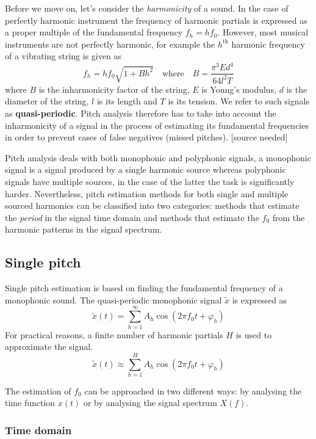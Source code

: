 \documentclass[american,]{article}
\begin{document}
Before we move on, let's consider the \emph{harmonicity} of a sound.
In the case of perfectly harmonic instrument the frequency
of harmonic partials is expressed as a proper multiple
of the fundamental frequency \(f_h = h f_0\).
However, most musical instruments are not perfectly harmonic,
for example the \(h^\text{th}\) harmonic frequency
of a vibrating string is given as
\[ f_h = h f_0 \sqrt{1 + Bh^2} \quad\text{where}\quad
    B = \frac{\pi^3 Ed^4}{64l^2T}\]
where \(B\) is the inharmonicity factor of the string,
\(E\) is Young's modulus, \(d\) is the diameter of the string,
\(l\) is its length and \(T\) is its tension.
We refer to such signals as \textbf{quasi-periodic}.
Pitch analysis therefore has to take into account
the inharmonicity of a signal in the process of estimating
its fundamental frequencies in order to prevent
cases of false negatives (missed pitches).
{[}source needed{]}

Pitch analysis deals with both monophonic and polyphonic signals,
a monophonic signal is a signal produced by a single harmonic
source whereas polyphonic signals have multiple sources,
in the case of the latter the
task is significantly harder.
Nevertheless, pitch estimation methods for both
single and multiple sourced harmonics can be
classified into two categories: methods that
estimate the \emph{period} in the signal time domain
and methods that estimate the \(f_0\) from the harmonic
patterns in the signal spectrum.

\hypertarget{single-pitch}{%
\subsection{Single pitch}\label{single-pitch}}

Single pitch estimation is based on finding the fundamental
frequency of a monophonic sound.
The quasi-periodic monophonic signal \(\tilde{x}\) is expressed as
\[\tilde{x}(t)=\sum_{h=1}^{\infty} A_h\cos(2\pi f_0 t + \varphi_h)\]
For practical reasons, a finite number of harmonic
partials \(H\) is used to approximate the signal.
\[\tilde{x}(t)\approx\sum_{h=1}^{H} A_h\cos(2\pi f_0 t + \varphi_h)\]

The estimation of \(f_0\) can be approached in two
different ways: by analysing the time function \(x(t)\)
or by analysing the signal spectrum \(X(f)\).

\hypertarget{time-domain}{%
\subsubsection{Time domain}\label{time-domain}}
\end{document}
